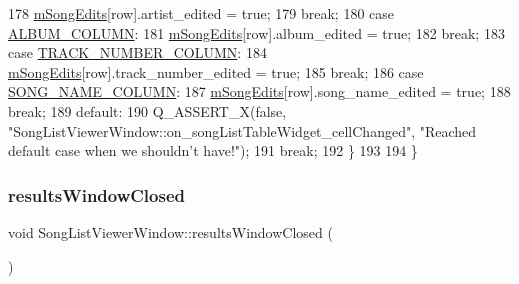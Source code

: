 \begin{DoxyCode}
178             \mbox{\hyperlink{class_song_list_viewer_window_aa38d8a91dc7ebe0925602b3846c34fdc}{mSongEdits}}[row].artist\_edited = \textcolor{keyword}{true};
179             \textcolor{keywordflow}{break};
180         \textcolor{keywordflow}{case} \mbox{\hyperlink{songlistviewerwindow_8h_a36e2a49e6de166851f1039129ea2a9fb}{ALBUM\_COLUMN}}:
181             \mbox{\hyperlink{class_song_list_viewer_window_aa38d8a91dc7ebe0925602b3846c34fdc}{mSongEdits}}[row].album\_edited = \textcolor{keyword}{true};
182             \textcolor{keywordflow}{break};
183         \textcolor{keywordflow}{case} \mbox{\hyperlink{songlistviewerwindow_8h_ab082e8ecd5faa2301f1d67d8df3b0eee}{TRACK\_NUMBER\_COLUMN}}:
184             \mbox{\hyperlink{class_song_list_viewer_window_aa38d8a91dc7ebe0925602b3846c34fdc}{mSongEdits}}[row].track\_number\_edited = \textcolor{keyword}{true};
185             \textcolor{keywordflow}{break};
186         \textcolor{keywordflow}{case} \mbox{\hyperlink{songlistviewerwindow_8h_a7376276fcf9a1862cfadc5ab562d3672}{SONG\_NAME\_COLUMN}}:
187             \mbox{\hyperlink{class_song_list_viewer_window_aa38d8a91dc7ebe0925602b3846c34fdc}{mSongEdits}}[row].song\_name\_edited = \textcolor{keyword}{true};
188             \textcolor{keywordflow}{break};
189         \textcolor{keywordflow}{default}:
190             Q\_ASSERT\_X(\textcolor{keyword}{false}, \textcolor{stringliteral}{"SongListViewerWindow::on\_songListTableWidget\_cellChanged"}, \textcolor{stringliteral}{"Reached default
       case when we shouldn't have!"});
191             \textcolor{keywordflow}{break};
192     \}
193 
194 \}
\end{DoxyCode}
\mbox{\label{class_song_list_viewer_window_aa87ae7b7b4d0620111303d1cad334320}} 
\subsubsection{\texorpdfstring{results\+Window\+Closed}{resultsWindowClosed}}
{\footnotesize\ttfamily void Song\+List\+Viewer\+Window\+::results\+Window\+Closed (\begin{DoxyParamCaption}{ }\end{DoxyParamCaption})\hspace{0.3cm}{\ttfamily [signal]}}



